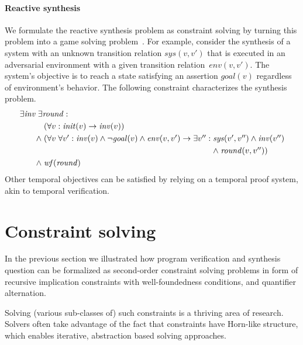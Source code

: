 \documentclass{new_tlp}
\newcommand{\limp}{\rightarrow}
\newcommand{\init}{\mathit{init}}
\newcommand{\inv}{\mathit{inv}}
\newcommand{\round}{\mathit{round}}
\newcommand{\wf}{\mathit{wf}}
\newcommand{\sys}{\mathit{sys}}
\newcommand{\env}{\mathit{env}}
\newcommand{\goal}{\mathit{goal}}
\begin{document}
\paragraph{Reactive synthesis}

We formulate the reactive synthesis problem as constraint solving by
turning this problem into a game solving
problem~\cite{CinderellaPOPL14}.
For example, consider the synthesis of a system with an unknown
transition relation $\sys(v, v')$ that is executed in an adversarial
environment with a given transition relation~$\env(v, v')$. 
The system's objective is to reach a state satisfying an assertion
$\goal(v)$ regardless of environment's behavior.
The following constraint characterizes the synthesis problem.
\begin{equation*}
  \begin{array}[t]{@{}l@{}}
    \exists \inv\; \exists \round: \\[\jot]
    \qquad
    \begin{array}[t]{@{}l@{\;}l@{}}
      & (\forall v: \init(v) \limp \inv(v)) \\[\jot]
      \land & 
      (\forall v\;\forall v': \inv(v) \land \neg \goal(v) \land \env(v, v') \limp 
      \exists v'': 
      \begin{array}[t]{@{}l@{}}
        \sys(v',v'') \land \inv(v'')\\[\jot]
        \mathrel{\land} \round(v, v'')) \\[\jot]
      \end{array}\\
      \land & \wf(\round)
    \end{array}
  \end{array}
\end{equation*}
Other temporal objectives can be satisfied by relying on a temporal
proof system, akin to temporal verification.

\section{Constraint solving}

In the previous section we illustrated how program verification and
synthesis question can be formalized as second-order constraint
solving problems in form of recursive implication constraints with
well-foundedness conditions, and quantifier alternation. 

Solving (various sub-classes of) such constraints is a thriving area
of research.
Solvers often take advantage of the fact that constraints have
Horn-like structure, which enables iterative, abstraction based
solving approaches.
\end{document}

